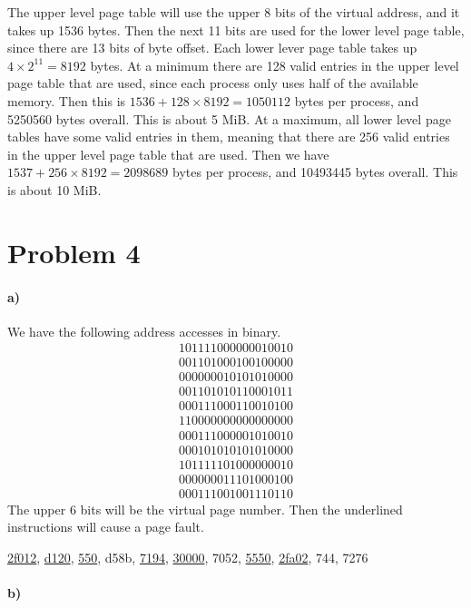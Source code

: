 \documentclass[12pt]{article}
\begin{document}
The upper level page table will use the upper 8 bits of the virtual address, and it takes up 1536 bytes. Then the next 11 bits
are used for the lower level page table, since there are 13 bits of byte offset. Each lower lever page table takes up
\(4\times 2^{11} = 8192\) bytes. At a minimum there are 128 valid entries in the upper level page table that are used, since
each process only uses half of the available memory. Then this is \(1536+128\times 8192 = 1050112\) bytes per process, and
5250560 bytes overall. This is about 5 MiB. At a maximum, all lower level page tables have some valid entries in them, meaning
that there are 256 valid entries in the upper level page table that are used. Then we have \(1537+256\times 8192= 2098689\) bytes
per process, and 10493445 bytes overall. This is about 10 MiB.

\section*{Problem 4}

\paragraph{a)}

We have the following address accesses in binary.
\begin{gather*}
        101111000000010010\\
        001101000100100000\\
        000000010101010000\\
        001101010110001011\\
        000111000110010100\\
        110000000000000000\\
        000111000001010010\\
        000101010101010000\\
        101111101000000010\\
        000000011101000100\\
        000111001001110110
\end{gather*}
The upper 6 bits will be the virtual page number. Then the underlined instructions will cause a page fault.
\begin{center}
        \underline{2f012}, \underline{d120}, \underline{550}, d58b, \underline{7194}, \underline{30000}, 7052,
        \underline{5550}, \underline{2fa02}, 744, 7276
\end{center}

\paragraph{b)}
\end{document}
